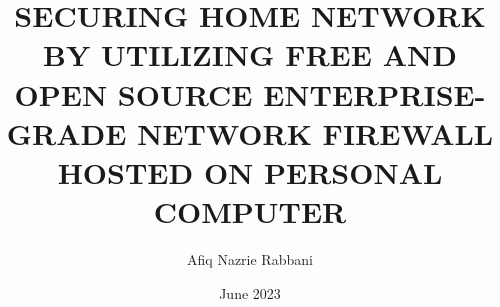 \documentclass[a4paper, 12pt, oneside, onecolumn, final, openany]{report}
\title{SECURING HOME NETWORK BY UTILIZING FREE AND OPEN SOURCE ENTERPRISE-GRADE NETWORK FIREWALL HOSTED ON PERSONAL COMPUTER}
\date{June 2023}
\author{
	Afiq Nazrie Rabbani
}
\begin{document}
\setcounter{page}{0}




% 


% 

\pagestyle{plain}









% 

\renewcommand*\contentsname{TABLE OF CONTENTS}
\renewcommand*\appendixtocname{LIST OF APPENDICES}
\renewcommand*\listfigurename{LIST OF FIGURES}
\renewcommand*\listtablename{LIST OF TABLES}
\renewcommand*\bibname{REFERENCES}

\tableofcontents
\listofappendices
{%
	\let\oldnumberline\numberline%
	\renewcommand{\numberline}{\figurename~\oldnumberline}%
	\listoffigures%
}
{%
	\let\oldnumberline\numberline%
	\renewcommand{\numberline}{\tablename~\oldnumberline}%
	\listoftables%
}


\renewcommand{\chaptername}{CHAPTER}







\end{document}
